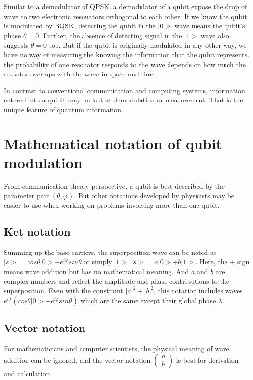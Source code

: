 \documentclass{book}
\begin{document}
Similar to a demodulator of QPSK. a demodulator of a qubit expose the drop of wave to two electronic resonators orthogonal to each other.  If we know the qubit is modulated by BQSK, detecting the qubit in the $|0>$ wave means the qubit's phase $\theta = 0$. Further, the absence of detecting signal in the $|1>$ wave also suggests $\theta = 0$ too. But if the qubit is originally modulated in any other way, we have no way of measuring the knowing the information that the qubit represents. the probability of one resonator responds to the wave depends on how much the resontor overlaps with the wave in space and time.

In contrast to conventional communication and computing systems, information entered into a quibit may be lost at demodulation or measurement. That is the unique feature of quantum information.

\section{Mathematical notation of qubit modulation}
From communication theory perspective, a qubit is best described by the parameter pair $(\theta, \varphi)$. But other notations developed by physicists may be easier to use when working on problems involving more than one qubit. 
\subsection{Ket notation}
Summing up the base carriers, the superposition wave can be noted as $|s> = cos{\theta} |0> + e^{i \varphi} sin{\theta}$ or simply $ |1>$ $|s> = a |0> + b |1>$. Here, the $+$ sign means wave addition but has no mathematical meaning. And $a$ and $b$ are complex numbers and reflect the amplitude and phase contributions to the superposition. Even with the constraint $|a|^2+ |b|^2$, this notation includes waves $e^{i\lambda} (cos{\theta} |0> + e^{i \varphi} sin{\theta})$ which are the same except their global phase $\lambda$.

\subsection{Vector notation}
For mathematicians and computer scientists, the physical meaning of wave addition can be ignored, and the vector notation $
\begin{pmatrix}
    a \\
    b
\end{pmatrix}$ is best for derivation and calculation.
\end{document}
